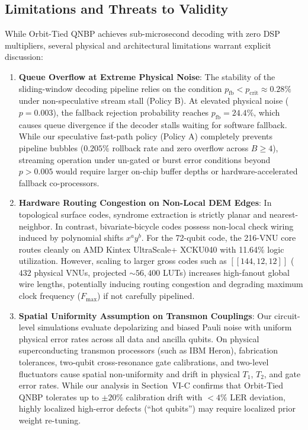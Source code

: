 \documentclass[journal]{IEEEtran}
\begin{document}
\subsection{Limitations and Threats to Validity}
While Orbit-Tied QNBP achieves sub-microsecond decoding with zero DSP multipliers, several physical and architectural limitations warrant explicit discussion:
\begin{enumerate}
    \item \textbf{Queue Overflow at Extreme Physical Noise}: The stability of the sliding-window decoding pipeline relies on the condition $p_{\text{fb}} < p_{\text{crit}} \approx 0.28\%$ under non-speculative stream stall (Policy B). At elevated physical noise ($p = 0.003$), the fallback rejection probability reaches $p_{\text{fb}} = 24.4\%$, which causes queue divergence if the decoder stalls waiting for software fallback. While our speculative fast-path policy (Policy A) completely prevents pipeline bubbles ($0.205\%$ rollback rate and zero overflow across $B \ge 4$), streaming operation under un-gated or burst error conditions beyond $p > 0.005$ would require larger on-chip buffer depths or hardware-accelerated fallback co-processors.
    \item \textbf{Hardware Routing Congestion on Non-Local DEM Edges}: In topological surface codes, syndrome extraction is strictly planar and nearest-neighbor. In contrast, bivariate-bicycle codes possess non-local check wiring induced by polynomial shifts $x^a y^b$. For the 72-qubit code, the 216-VNU core routes cleanly on AMD Kintex UltraScale+ XCKU040 with 11.64\% logic utilization. However, scaling to larger gross codes such as $[[144, 12, 12]]$ ($432$ physical VNUs, projected $\sim 56,400$ LUTs) increases high-fanout global wire lengths, potentially inducing routing congestion and degrading maximum clock frequency ($F_{\max}$) if not carefully pipelined.
    \item \textbf{Spatial Uniformity Assumption on Transmon Couplings}: Our circuit-level simulations evaluate depolarizing and biased Pauli noise with uniform physical error rates across all data and ancilla qubits. On physical superconducting transmon processors (such as IBM Heron), fabrication tolerances, two-qubit cross-resonance gate calibrations, and two-level fluctuators cause spatial non-uniformity and drift in physical $T_1$, $T_2$, and gate error rates. While our analysis in Section~VI-C confirms that Orbit-Tied QNBP tolerates up to $\pm 20\%$ calibration drift with $<4\%$ LER deviation, highly localized high-error defects (``hot qubits'') may require localized prior weight re-tuning.
\end{enumerate}
\end{document}

